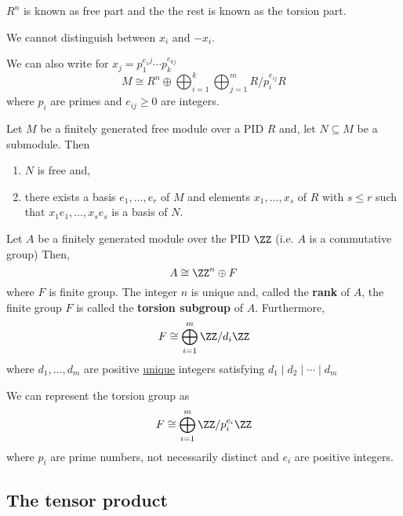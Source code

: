 \documentclass[12pt, a4paper]{article}
\begin{document}
\begin{mdnote}
    \(R^n\) is known as free part and the the rest is known as the torsion part.
\end{mdnote}

\begin{mdremark}
    We cannot distinguish between \(x_i\) and \(-x_i\).
\end{mdremark}

\begin{mdremark}
    We can also write for \(x_j = p_1^{e_1j}\cdots p_k^{e_{kj}}\)
    \[M \cong R^n \oplus \bigoplus_{i=1}^k \bigoplus_{j=1}^m R/p_i^{e_{ij}}R\]
    where \(p_i\) are primes and \(e_{ij}\geq 0\) are integers. 
\end{mdremark}

\begin{mdthm}
    Let \(M\) be a finitely generated free module over a PID \(R\) and, let \(N \subseteq M\) be a submodule. Then
    \begin{enumerate}
        \item \(N\) is free and,
        \item there exists a basis \(e_1,\ldots,e_r\) of \(M\) and elements \(x_1,\ldots,x_s\) of \(R\) with \(s \leq r\) such that \(x_1e_1,\ldots,x_se_s\) is a basis of \(N\).
    \end{enumerate}
\end{mdthm}

\begin{mdcor}
    Let \(A\) be a finitely generated module over the PID \(\ZZ\) (i.e. \(A\) is a commutative group) Then,
    \[A \cong \ZZ^n \oplus F\]
    where \(F\) is finite group. The integer \(n\) is unique and, called the \textbf{rank} of \(A\), the finite group \(F\) is called the \textbf{torsion subgroup} of \(A\). Furthermore,
    \[F \cong \bigoplus_{i=1}^m \ZZ/d_i\ZZ\]
    where \(d_1,\ldots,d_m\) are positive \ul{unique} integers satisfying \(d_1 \mid d_2 \mid \cdots \mid d_m\)
\end{mdcor}

\begin{mdremark}
    We can represent the torsion group as 
    \[F \cong\bigoplus_{i=1}^m \ZZ/p_i^{e_i}\ZZ\]
    where \(p_i\) are prime numbers, not necessarily distinct and \(e_i \) are positive integers.
\end{mdremark}

\subsection{The tensor product}
\end{document}
